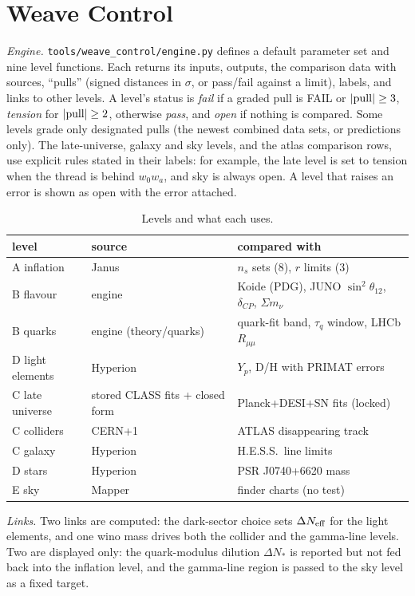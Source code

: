 \documentclass[aps,prd,twocolumn,superscriptaddress,nofootinbib,showkeys]{revtex4-2}
\begin{document}
\section{Weave Control}
\textit{Engine.} \texttt{tools/weave\_control/engine.py} defines a default parameter set and nine level functions. Each returns its inputs, outputs, the comparison data with sources, ``pulls'' (signed distances in $\sigma$, or pass/fail against a limit), labels, and links to other levels. A level's status is \emph{fail} if a graded pull is FAIL or $|{\rm pull}|\ge3$, \emph{tension} for $|{\rm pull}|\ge2$, otherwise \emph{pass}, and \emph{open} if nothing is compared. Some levels grade only designated pulls (the newest combined data sets, or predictions only). The late-universe, galaxy and sky levels, and the atlas comparison rows, use explicit rules stated in their labels: for example, the late level is set to tension when the thread is behind $w_0w_a$, and sky is always open. A level that raises an error is shown as open with the error attached.
\begin{table}[b]
\caption{\label{tab:levels}Levels and what each uses.}
\begin{ruledtabular}\begin{tabular}{lll}
level & source & compared with\\ \hline
A inflation & Janus & $n_s$ sets (8), $r$ limits (3)\\
B flavour & engine & Koide (PDG), JUNO $\sin^2\theta_{12}$, $\delta_{CP}$, $\Sigma m_\nu$\\
B quarks & engine (theory/quarks) & quark-fit band, $\tau_q$ window, LHCb $R_{\mu\mu}$\\
D light elements & Hyperion & $Y_p$, D/H with PRIMAT errors\\
C late universe & stored CLASS fits + closed form & Planck+DESI+SN fits (locked)\\
C colliders & CERN+1 & ATLAS disappearing track\\
C galaxy & Hyperion & H.E.S.S.\ line limits\\
D stars & Hyperion & PSR J0740+6620 mass\\
E sky & Mapper & finder charts (no test)\\
\end{tabular}\end{ruledtabular}
\end{table}
\textit{Links.} Two links are computed: the dark-sector choice sets $\Delta N_{\rm eff}$ for the light elements, and one wino mass drives both the collider and the gamma-line levels. Two are displayed only: the quark-modulus dilution $\Delta N_*$ is reported but not fed back into the inflation level, and the gamma-line region is passed to the sky level as a fixed target.
\end{document}
